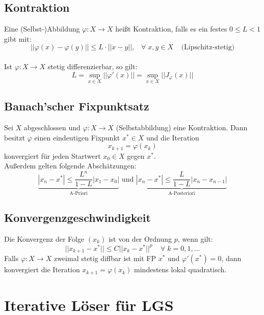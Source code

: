 \documentclass[a4paper,twocolumn,10pt]{article}
\begin{document}
\subsection{Kontraktion}
Eine (Selbst-)Abbildung $\varphi:X\rightarrow X$ heißt Kontraktion, falls es ein festes $0\leq L<1$ gibt mit:
\begin{equation*}
||\varphi(x)-\varphi(y)||\leq L\cdot ||x-y||,\;\;\;\forall\;x,y\in X\;\;\;\;\text{(Lipschitz-stetig)}
\end{equation*}\\
Ist $\varphi:X\rightarrow X$ stetig differenzierbar, so gilt:
\begin{equation*}
L=\sup\limits_{x\in X}||\varphi'(x)||=\sup\limits_{x\in X}||J_{\varphi}(x)||
\end{equation*}

\subsection{Banach'scher Fixpunktsatz}
Sei $X$ abgeschlossen und $\varphi:X\rightarrow X$ (Selbstabbildung) eine Kontraktion. Dann besitzt $\varphi$ einen eindeutigen Fixpunkt $x^*\in X$ und die Iteration
\begin{equation*}
x_{k+1}=\varphi(x_k)
\end{equation*}
konvergiert für jeden Startwert $x_0\in X$ gegen $x^*$.\\
Außerdem gelten folgende Abschätzungen:
\begin{equation*}
\underbrace{|x_n-x^*|\leq \frac{L^n}{1-L}|x_1-x_0|}_{\text{A-Priori}}\text{ und }\underbrace{|x_n-x^*|\leq\frac{L}{1-L}|x_n-x_{n-1}|}_{\text{A-Posteriori}}
\end{equation*}

\subsection{Konvergenzgeschwindigkeit}
Die Konvergenz der Folge $(x_k)$ ist von der Ordnung $p$, wenn gilt:
\begin{equation*}
||x_{k+1}-x^*||\leq C||x_k-x^*||^p\;\;\;\;\forall\;k=0,1,...
\end{equation*}
Falls $\varphi:X\rightarrow X$ zweimal stetig diffbar ist mit FP $x^*$ und $\varphi'(x^*)=0$, dann konvergiert die Iteration $x_{k+1}=\varphi(x_k)$ mindestens lokal quadratisch.

\section{Iterative Löser für LGS}
\end{document}
